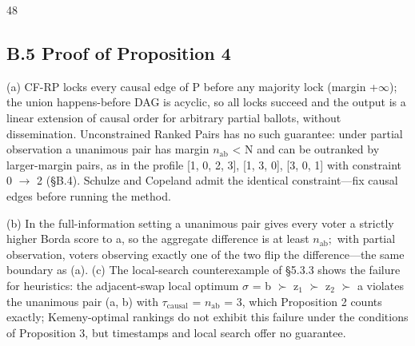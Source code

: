 \documentclass[journal]{IEEEtran}
\begin{document}
\begin{thebibliography}{48}
\subsection{B.5 Proof of Proposition 4}
(a) CF-RP locks every causal edge of P before any majority lock (margin +$\infty$); the union happens-before DAG is acyclic, so all locks succeed and the output is a linear extension of causal order for arbitrary partial ballots, without dissemination. Unconstrained Ranked Pairs has no such guarantee: under partial observation a unanimous pair has margin $n_{\mathrm{ab}}$ < N and can be outranked by larger-margin pairs, as in the profile [1, 0, 2, 3], [1, 3, 0], [3, 0, 1] with constraint 0 $\rightarrow$ 2 (§B.4). Schulze and Copeland admit the identical constraint—fix causal edges before running the method.

(b) In the full-information setting a unanimous pair gives every voter a strictly higher Borda score to a, so the aggregate difference is at least $n_{\mathrm{ab}};$ with partial observation, voters observing exactly one of the two flip the difference—the same boundary as (a). (c) The local-search counterexample of §5.3.3 shows the failure for heuristics: the adjacent-swap local optimum $\sigma$ = b $\succ$ z$_{1}$ $\succ$ z$_{2}$ $\succ$ a violates the unanimous pair (a, b) with $\tau_{\mathrm{causal}}$ = $n_{\mathrm{ab}}$ = 3, which Proposition 2 counts exactly; Kemeny-optimal rankings do not exhibit this failure under the conditions of Proposition 3, but timestamps and local search offer no guarantee.


\end{thebibliography}
\end{document}
